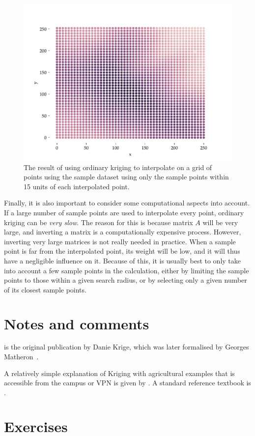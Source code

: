 \begin{figure}[htbp]
\centering
\includegraphics[width=0.5\linewidth]{figs/interpolation}
\caption{The result of using ordinary kriging to interpolate on a grid of points using the sample dataset using only the sample points within 15 units of each interpolated point.}%
\label{fig:interpolation}
\end{figure}

Finally, it is also important to consider some computational aspects into account.
If a large number of sample points are used to interpolate every point, ordinary kriging can be \emph{very slow}.
The reason for this is because matrix \(A\) will be very large, and inverting a matrix is a computationally expensive process.
However, inverting very large matrices is not really needed in practice.
When a sample point is far from the interpolated point, its weight will be low, and it will thus have a negligible influence on it.
Because of this, it is usually best to only take into account a few sample points in the calculation, either by limiting the sample points to those within a given search radius, or by selecting only a given number of its closest sample points.


%
\section{Notes and comments}

\citet{Krige51} is the original publication by Danie Krige, which was later formalised by Georges Matheron~\citep{Matheron62,Matheron65}.

A relatively simple explanation of Kriging with agricultural examples that is accessible from the campus or VPN is given by \citet{Oliver15}.
A standard reference textbook is \citet{Wackernagel03}.
 

%
\section{Exercises}

